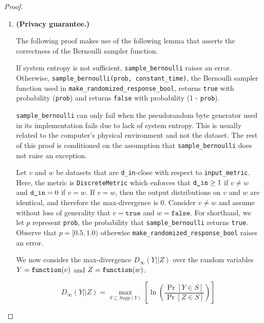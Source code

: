 \documentclass{article}
\begin{document}
\begin{proof} 
\hfill
\begin{enumerate}
    \item \textbf{(Privacy guarantee.)} 
    
    \begin{tcolorbox}
\begin{note}
The following proof makes use of the following lemma that asserts the correctness of the Bernoulli sampler function.
    \begin{lemma}
    If system entropy is not sufficient, \texttt{sample\_bernoulli} raises an error. 
    Otherwise, \texttt{sample\_bernoulli(prob, constant\_time)}, the Bernoulli sampler function used in \texttt{make\_randomized\_response\_bool}, 
    returns \texttt{true} with probability (\texttt{prob}) and returns  \texttt{false} with probability (1 - \texttt{prob}).
    \end{lemma}
\end{note}
\end{tcolorbox}

    \texttt{sample\_bernoulli} can only fail when the pseudorandom byte generator used in its implementation fails due to lack of system entropy. 
    This is usually related to the computer's physical environment and not the dataset. 
    The rest of this proof is conditioned on the assumption that \texttt{sample\_bernoulli} does not raise an exception. 
    
    Let $v$ and $w$ be datasets that are \texttt{d\_in}-close with respect to \texttt{input\_metric}.
    Here, the metric is \texttt{DiscreteMetric} which enforces that $\texttt{d\_in} \geq 1$ if $v \ne w$ and $\texttt{d\_in} = 0$ if $v = w$. 
    If $v = w$, then the output distributions on $v$ and $w$ are identical, and therefore the max-divergence is 0.
    Consider $v \ne w$ and assume without loss of generality that $v = \texttt{true}$ and $w = \texttt{false}$. 
    For shorthand, we let $p$ represent \texttt{prob}, the probability that \texttt{sample\_bernoulli} returns \texttt{true}. 
    Observe that $p = [0.5, 1.0)$ otherwise \texttt{make\_randomized\_response\_bool} raises an error. 
    
    We now consider the max-divergence $D_{\infty}(Y||Z)$ over the random variables $Y = \texttt{function}(v)$ and $Z = \texttt{function}(w)$.
    
    \[
    D_{\infty}(Y||Z) = \max_{S \subseteq Supp(Y)}\left[\ln (\frac{\Pr[Y \in S]}{\Pr[Z \in S]})\right] 
    \]
    

\end{enumerate}
\end{proof}
\end{document}
